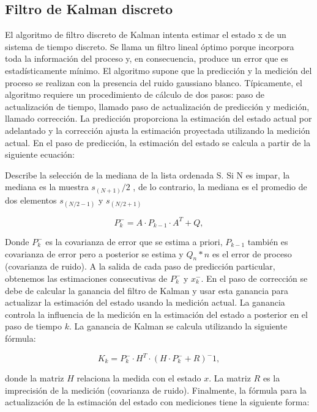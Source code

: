 \documentclass[10pt,a4paper]{article}
\begin{document}
\begin{multicols}{2}
\begin{itemize}
\subsection{Filtro de Kalman discreto}
El algoritmo de filtro discreto de Kalman intenta estimar el estado x de un sistema de tiempo discreto. Se llama un filtro lineal óptimo porque incorpora toda la información del proceso y, en consecuencia, produce un error que es estadísticamente mínimo. El algoritmo supone que la predicción y la medición del proceso se realizan con la presencia del ruido gaussiano blanco.
Típicamente, el algoritmo requiere un procedimiento de cálculo de dos pasos: paso de actualización de tiempo, llamado paso de actualización de predicción y medición, llamado corrección. La predicción proporciona la estimación del estado actual por adelantado y la corrección ajusta la estimación proyectada utilizando la medición actual. En el paso de predicción, la estimación del estado se calcula a partir de la siguiente ecuación:

Describe la selección de la mediana de la lista ordenada S. Si N es impar, la mediana es la muestra  $s_(N+1)/2$ , de lo contrario, la mediana es el promedio de dos elementos $s_(N/2-1)$ y $s_(N/2+1)$

\begin{equation}
P_{k}^-=A \cdot P_{k-1} \cdot A^{T}+Q,
\end{equation}


Donde $P_{k}^-$ es la covarianza de error que se estima a priori, $P_{k-1}$ también es covarianza de error pero a posterior se estima y $Q_{n}*n$ es el error de proceso (covarianza de ruido).
A la salida de cada paso de predicción particular, obtenemos las estimaciones consecutivas de $P_{k}^-$ y $x_{k}^-$. En el paso de corrección se debe de calcular la ganancia del filtro de Kalman y usar esta ganancia para actualizar la estimación del estado usando la medición actual. La ganancia controla la influencia de la medición en la estimación del estado a posterior en el paso de tiempo $k$. La ganancia de Kalman se calcula utilizando la siguiente fórmula:


\begin{equation}
K_{k}=P_{k}^- \cdot H^T \cdot (H \cdot P_{k}^-+R)^-1,
\end{equation}

donde la matriz $H$ relaciona la medida con el estado $x$. La matriz $R$ es la imprecisión de la medición (covarianza de ruido). Finalmente, la fórmula para la actualización de la estimación del estado con mediciones tiene la siguiente forma:


\end{itemize}
\end{multicols}
\end{document}
